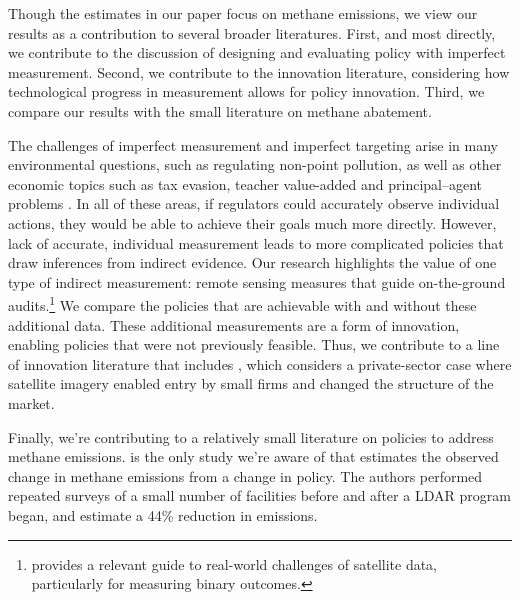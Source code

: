 \documentclass[12pt,oneside,letterpaper]{article}
\theoremstyle{definition}
\begin{document}
\begin{refsection}
Though the estimates in our paper focus on methane emissions, we view our results as a contribution to several broader literatures.
First, and most directly, we contribute to the discussion of designing and evaluating policy with imperfect measurement.
Second, we contribute to the innovation literature, considering how technological progress in measurement allows for policy innovation.
Third, we compare our results with the small literature on methane abatement.


The challenges of imperfect measurement and imperfect targeting arise in many environmental questions, such as regulating non-point pollution, as well as other economic topics such as tax evasion, teacher value-added and principal--agent problems
\parencite{
Segerson:1988,
Allingham/Sandmo:1972,
Chetty/Friedman/Rockoff:2014,
}.
In all of these areas, if regulators could accurately observe individual actions, they would be able to achieve their goals much more directly.
However, lack of accurate, individual measurement leads to more complicated policies that draw inferences from indirect evidence.
Our research highlights the value of one type of indirect measurement: remote sensing measures that guide on-the-ground audits.\footnote{%
\textcite{AlixGarcia/Millimet:2020} provides a relevant guide to real-world challenges of satellite data, particularly for measuring binary outcomes.
}
We compare the policies that are achievable with and without these additional data.
These additional measurements are a form of innovation, enabling policies that were not previously feasible.
Thus, we contribute to a line of innovation literature that includes \textcite{Nagaraj:2020}, which considers a private-sector case where satellite imagery enabled entry by small firms and changed the structure of the market.

Finally, we're contributing to a relatively small literature on policies to address methane emissions.
\textcite{Ravikumar/etal:2020} is the only study we're aware of that estimates the observed change in methane emissions from a change in policy.
The authors performed repeated surveys of a small number of facilities before and after a \gls{LDAR} program began, and estimate a 44\% reduction in emissions.


\end{refsection}
\end{document}
